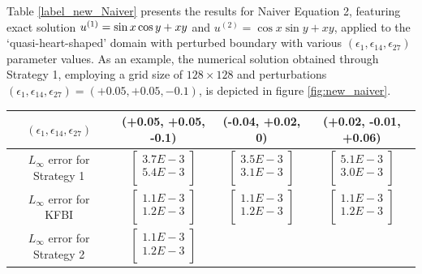 \documentclass{article}
\begin{document}
Table \ref{label_new_Naiver} presents the results for Naiver Equation 2, featuring exact solution $u^{(1)} = \sin x \cos y \\ + xy$ and $u^{(2)} = \cos x \sin y + xy$, applied to the `quasi-heart-shaped' domain with perturbed boundary with various $(\epsilon_1, \epsilon_{14}, \epsilon_{27})$ parameter values. As an example, the numerical solution obtained through Strategy 1, employing a grid size of $128 \times 128$ and perturbations $(\epsilon_1, \epsilon_{14}, \epsilon_{27}) = (+0.05, +0.05, -0.1)$, is depicted in figure \ref{fig:new_naiver}.
\begin{table}[ht]
    \centering
    \begin{tabular}{|c|c|c|c|} \hline 
         $(\epsilon_1, \epsilon_{14}, \epsilon_{27}) $ & (+0.05, +0.05, -0.1) & (-0.04, +0.02, 0) & (+0.02, -0.01, +0.06)\\ \hline 
         $L_{\infty}$ error for Strategy 1 
         & $\begin{bmatrix}  3.7E-3\\ 5.4E-3\\ \end{bmatrix}$ 
         & $\begin{bmatrix}  3.5E-3\\ 3.1E-3\\ \end{bmatrix}$ 
         & $\begin{bmatrix}  5.1E-3\\ 3.0E-3\\ \end{bmatrix}$    \\ \hline
         $L_{\infty}$ error for KFBI 
         &  $\begin{bmatrix}  1.1E-3\\ 1.2E-3\\ \end{bmatrix}$
         &  $\begin{bmatrix}  1.1E-3\\ 1.2E-3\\ \end{bmatrix}$
         &  $\begin{bmatrix}  1.1E-3\\ 1.2E-3\\ \end{bmatrix}$  \\ \hline
         $L_{\infty}$ error for Strategy 2 
         &  $\begin{bmatrix}  1.1E-3\\ 1.2E-3\\ \end{bmatrix}$

\end{tabular}
\end{table}
\end{document}
